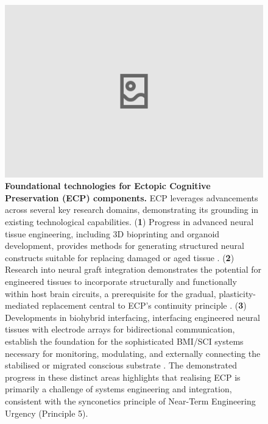 \documentclass[10pt]{article}
\begin{document}
\begin{sloppypar}
  \begin{figure}[ht]
    \centering
    \includegraphics[width=\textwidth]{figures/ecp-near-term-technologies.png}
    \caption[ECP: Foundational technologies for Ectopic Cognitive Preservation components]{\textbf{Foundational technologies for Ectopic Cognitive Preservation (ECP) components.} ECP leverages advancements across several key research domains, demonstrating its grounding in existing technological capabilities. (\textbf{1}) Progress in advanced neural tissue engineering, including 3D bioprinting and organoid development, provides methods for generating structured neural constructs suitable for replacing damaged or aged tissue \citep{jin_integration_2023}. (\textbf{2}) Research into neural graft integration demonstrates the potential for engineered tissues to incorporate structurally and functionally within host brain circuits, a prerequisite for the gradual, plasticity-mediated replacement central to ECP’s continuity principle \citep{hebert_lab_research_2025, jin_integration_2023}. (\textbf{3}) Developments in biohybrid interfacing, interfacing engineered neural tissues with electrode arrays for bidirectional communication, establish the foundation for the sophisticated BMI/SCI systems necessary for monitoring, modulating, and externally connecting the stabilised or migrated conscious substrate \citep{jordan_open_2024}. The demonstrated progress in these distinct areas highlights that realising ECP is primarily a challenge of systems engineering and integration, consistent with the synconetics principle of Near-Term Engineering Urgency (Principle 5).}
    \label{fig:ecp-near-term-technologies}
  \end{figure}


\end{sloppypar}
\end{document}
